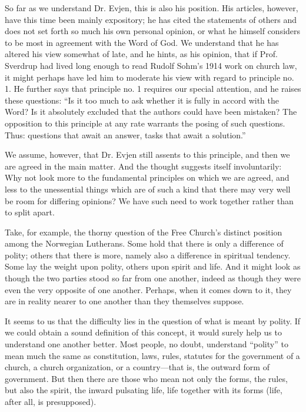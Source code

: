 So far as we understand Dr. Evjen, this is also his position. His articles, however, have this time been mainly expository; he has cited the statements of others and does not set forth so much his own personal opinion, or what he himself considers to be most in agreement with the Word of God. We understand that he has altered his view somewhat of late, and he hints, as his opinion, that if Prof. Sverdrup had lived long enough to read Rudolf Sohm’s 1914 work on church law, it might perhaps have led him to moderate his view with regard to principle no. 1. He further says that principle no. 1 requires our special attention, and he raises these questions: ``Is it too much to ask whether it is fully in accord with the Word? Is it absolutely excluded that the authors could have been mistaken? The opposition to this principle at any rate warrants the posing of such questions. Thus: questions that await an answer, tasks that await a solution.''

We assume, however, that Dr. Evjen still assents to this principle, and then we are agreed in the main matter. And the thought suggests itself involuntarily: Why not look more to the fundamental principles on which we are agreed, and less to the unessential things which are of such a kind that there may very well be room for differing opinions? We have such need to work together rather than to split apart.

Take, for example, the thorny question of the Free Church’s distinct position among the Norwegian Lutherans. Some hold that there is only a difference of polity; others that there is more, namely also a difference in spiritual tendency. Some lay the weight upon polity, others upon spirit and life. And it might look as though the two parties stood so far from one another, indeed as though they were even the very opposite of one another. Perhaps, when it comes down to it, they are in reality nearer to one another than they themselves suppose.

It seems to us that the difficulty lies in the question of what is meant by polity. If we could obtain a sound definition of this concept, it would surely help us to understand one another better. Most people, no doubt, understand ``polity'' to mean much the same as constitution, laws, rules, statutes for the government of a church, a church organization, or a country---that is, the outward form of government. But then there are those who mean not only the forms, the rules, but also the spirit, the inward pulsating life, life together with its forms (life, after all, is presupposed).

